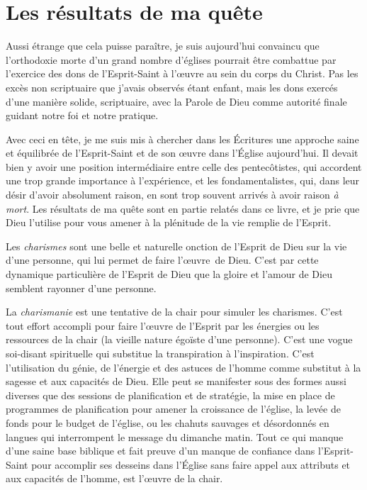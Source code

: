 \section{Les r\'esultats de ma qu\^ete}

Aussi étrange que cela puisse paraître, je suis aujour\-d'hui convaincu que
 l'orthodoxie morte d'un grand nombre d'églises pourrait être combattue par l'exercice des
 dons de l'Esprit-Saint à l'œuvre au sein du corps du Christ. Pas les excès non scriptuaire que
 j'avais observés étant enfant, mais les dons exercés d'une manière solide,
 scriptuaire, avec la Parole de Dieu comme autorité finale guidant notre foi et
 notre pratique.

Avec ceci en tête, je me suis mis à chercher dans les Écritures une
 approche saine et équilibrée de l'Esprit-Saint et de son œuvre dans l'Église
 aujourd'hui. Il devait bien y avoir une position inter\-mé\-di\-aire entre celle des
 pentecôtistes, qui accordent une trop grande importance à l'ex\-pé\-rience, et les
 fondamentalistes, qui, dans leur désir d'avoir absolument raison,
 en sont trop souvent arrivés à avoir raison \emph{à mort}.
 Les résultats de ma quête sont en partie relatés dans ce livre, et je prie que
 Dieu l'utilise pour vous amener à la plénitude de la vie remplie de
 l'Esprit.

Les \emph{charismes} sont une belle et naturelle onction de l'Esprit de Dieu
 sur la vie d'une personne, qui lui permet de faire l'œuvre~de Dieu. C'est par
 cette dynamique particulière de l'Esprit de Dieu que la gloire et l'amour de Dieu
 semblent rayonner d'une personne.

La \emph{charismanie} est une tentative de la chair pour simuler les charismes.
 C'est tout effort accompli pour faire l'œuvre de l'Esprit par les énergies ou les
 ressources de la chair (la vieille nature égoïste d'une personne). C'est
 une vogue soi-disant spirituelle qui substitue la transpiration à l'inspiration. C'est
 l'utilisation du génie, de l'énergie et des astuces de l'homme comme substitut
 à la sagesse et aux capacités de Dieu. Elle peut se manifester sous des formes
 aussi diverses que des sessions de planification et de stratégie, la mise en place de
 programmes de planification pour amener la croissance de l'église, la levée de fonds
 pour le budget de l'église, ou les chahuts sauvages et désordonnés en langues
 qui interrompent le message du dimanche matin. Tout ce qui manque d'une saine base
 biblique et fait preuve d'un manque de confiance dans l'Esprit-Saint pour
 accomplir ses desseins dans l'Église sans faire appel aux attributs
 et aux capacités de l'homme, est l'œuvre de la chair.

